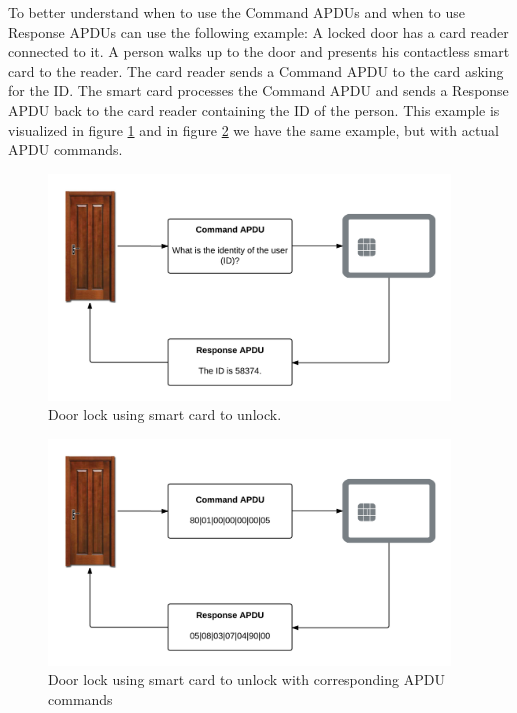 To better understand when to use the Command APDUs and when to use Response APDUs can use the following example: A locked door has a card reader connected to it. A person walks up to the door and presents his contactless smart card to the reader. The card reader sends a Command APDU to the card asking for the ID. The smart card processes the Command APDU and sends a Response APDU back to the card reader containing the ID of the person. This example is visualized in figure \ref{fig:doornfc} and in figure \ref{fig:doornfcapdu} we have the same example, but with actual APDU commands.

\begin{figure}[h!]
  \captionsetup{justification=centering,margin=1.5cm}
  \caption{Door lock using smart card to unlock.}
  \label{fig:doornfc}
  \centering
    \includegraphics[width=0.95\textwidth]{images/doornfc.png}
\end{figure}


\begin{figure}[h!]
  \captionsetup{justification=centering,margin=1.5cm}
  \caption{Door lock using smart card to unlock with corresponding APDU commands}
  \label{fig:doornfcapdu}
  \centering
    \includegraphics[width=0.95\textwidth]{images/doornfc_apdu.png}
\end{figure}

